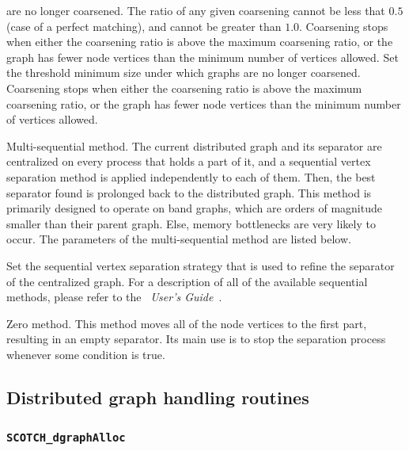 \begin{itemize}
\begin{itemize}
\begin{itemize}
are no longer coarsened. The ratio of any given coarsening cannot be
less that $0.5$ (case of a perfect matching), and cannot be greater
than $1.0$. Coarsening stops when either the coarsening ratio is
above the maximum coarsening ratio, or the graph
has fewer node vertices than the minimum number of vertices allowed.
\iteme[{\tt vert=}{\it nbr}]
Set the threshold minimum size under which graphs
are no longer coarsened. Coarsening stops when either the coarsening
ratio is above the maximum coarsening ratio, or the graph
has fewer node vertices than the minimum number of vertices allowed.
\end{itemize}
\iteme[{\tt q}]
Multi-sequential method. The current distributed graph and its
separator are centralized on every process that holds a part of it, and
a sequential vertex separation method is applied independently to each
of them. Then, the best separator found is prolonged back to the
distributed graph. This method is primarily designed to operate on
band graphs, which are orders of magnitude smaller than their parent
graph. Else, memory bottlenecks are very likely to occur.
The parameters of the multi-sequential method are listed below.
\begin{itemize}
\iteme[{\tt strat=}{\it strat}]
Set the sequential vertex separation strategy that is used to refine
the separator of the centralized graph. For a description of all of
the available sequential methods, please refer to the
{\it\scotch\ User's Guide}~\scotchcitesuser.
\end{itemize}
\iteme[{\tt z}]
Zero method. This method moves all of the node vertices to the first
part, resulting in an empty separator. Its main use is to stop the
separation process whenever some condition is true.
\end{itemize}
\end{itemize}

\subsection{Distributed graph handling routines}
\label{sec-lib-dgraph}

\subsubsection{{\tt SCOTCH\_dgraphAlloc}}

